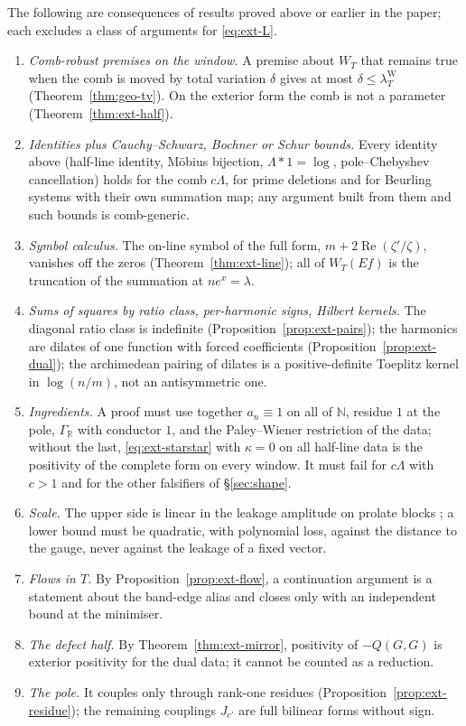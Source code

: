 \documentclass[11pt]{amsart}
\theoremstyle{definition}
\theoremstyle{remark}
\newcommand{\R}{\mathbb R}
\newcommand{\N}{\mathbb N}
\newcommand{\Rel}{\operatorname{Re}}
\newcommand{\lamW}{\lambda^{\mathrm W}_T}
\begin{document}
The following are consequences of results proved above or earlier in the paper; each excludes a class of arguments for
\eqref{eq:ext-L}.
\begin{enumerate}
\item \emph{Comb-robust premises on the window.} A premise about $W_T$ that remains true when the comb is moved by total
variation $\delta$ gives at most $\delta\le\lamW$ (Theorem~\ref{thm:geo-tv}). On the exterior form the comb is not a parameter
(Theorem~\ref{thm:ext-half}).
\item \emph{Identities plus Cauchy--Schwarz, Bochner or Schur bounds.} Every identity above (half-line identity, M\"obius
bijection, $\Lambda*1=\log$, pole--Chebyshev cancellation) holds for the comb $c\Lambda$, for prime deletions and for
Beurling systems with their own summation map; any argument built from them and such bounds is comb-generic.
\item \emph{Symbol calculus.} The on-line symbol of the full form, $m+2\Rel(\zeta'/\zeta)$, vanishes off the zeros
(Theorem~\ref{thm:ext-line}); all of $W_T(Ef)$ is the truncation of the summation at $ne^x=\lambda$.
\item \emph{Sums of squares by ratio class, per-harmonic signs, Hilbert kernels.} The diagonal ratio class is indefinite
(Proposition~\ref{prop:ext-pairs}); the harmonics are dilates of one function with forced coefficients
(Proposition~\ref{prop:ext-dual}); the archimedean pairing of dilates is a positive-definite Toeplitz kernel in $\log(n/m)$, not
an antisymmetric one.
\item \emph{Ingredients.} A proof must use together $a_n\equiv1$ on all of $\N$, residue $1$ at the pole, $\Gamma_\R$ with
conductor $1$, and the Paley--Wiener restriction of the data; without the last, \eqref{eq:ext-starstar} with $\kappa=0$ on all
half-line data is the positivity of the complete form on every window. It must fail for $c\Lambda$ with $c>1$ and for the
other falsifiers of \S\ref{sec:shape}.
\item \emph{Scale.} The upper side is linear in the leakage amplitude on prolate blocks \cite[Thm.~1.6]{Guo2026}; a lower bound
must be quadratic, with polynomial loss, against the distance to the gauge, never against the leakage of a fixed vector.
\item \emph{Flows in $T$.} By Proposition~\ref{prop:ext-flow}, a continuation argument is a statement about the band-edge alias
and closes only with an independent bound at the minimiser.
\item \emph{The defect half.} By Theorem~\ref{thm:ext-mirror}, positivity of $-Q(G,G)$ is exterior positivity for the dual data;
it cannot be counted as a reduction.
\item \emph{The pole.} It couples only through rank-one residues (Proposition~\ref{prop:ext-residue}); the remaining couplings
$J_{c'}$ are full bilinear forms without sign.
\end{enumerate}
\end{document}
